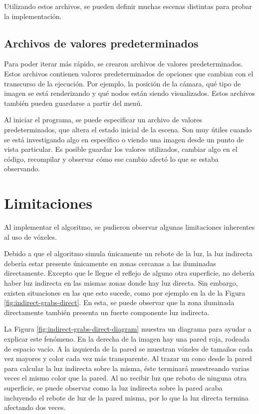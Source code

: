 Utilizando estos archivos, se pueden definir muchas escenas distintas para probar la implementación.

\subsection{Archivos de valores predeterminados}

Para poder iterar más rápido, se crearon archivos de valores predeterminados.
Estos archivos contienen valores predeterminados de opciones que cambian con el transcurso de la ejecución.
Por ejemplo, la posición de la cámara, qué tipo de imagen se está renderizando y qué nodos están siendo visualizados.
Estos archivos también pueden guardarse a partir del menú.

Al iniciar el programa, se puede especificar un archivo de valores predeterminados, que altera el estado inicial de la escena.
Son muy útiles cuando se está investigando algo en específico o viendo una imagen desde un punto de vista particular.
Es posible guardar los valores utilizados, cambiar algo en el código, recompilar y observar cómo ese cambio afectó lo que se estaba observando.

\section{Limitaciones}

Al implementar el algoritmo, se pudieron observar algunas limitaciones inherentes al uso de vóxeles.

Debido a que el algoritmo simula únicamente un rebote de la luz, la luz indirecta debería estar presente únicamente en zonas cercanas a las iluminadas directamente.
Excepto que le llegue el reflejo de alguno otra superficie, no debería haber luz indirecta en las mismas zonas donde hay luz directa.
Sin embargo, existen situaciones en las que esto sucede, como por ejemplo en la de la Figura \ref{fig:indirect-grabs-direct}.
En esta, se puede observar que la zona iluminada directamente también presenta un fuerte componente luz indirecta.

La Figura \ref{fig:indirect-grabs-direct-diagram} muestra un diagrama para ayudar a explicar este fenómeno.
En la derecha de la imagen hay una pared roja, rodeada de espacio vacío.
A la izquierda de la pared se muestran vóxeles de tamaños cada vez mayores y color cada vez más transparente.
Al trazar un cono desde la pared para calcular la luz indirecta sobre la misma, éste terminará muestreando varias veces el mismo color que la pared.
Al no recibir luz que reboto de ninguna otra superficie, se puede observar como la luz indirecta sobre la pared acaba incluyendo el rebote de luz de la pared misma, por lo que la luz directa termina afectando dos veces.

